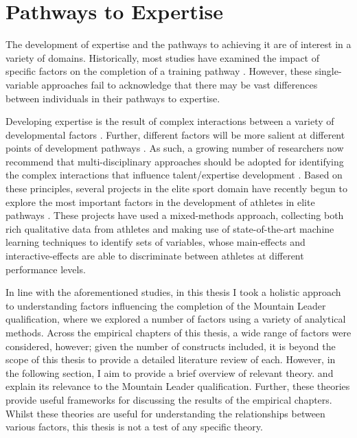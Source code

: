 \documentclass[
  12pt,
  a4paper,
]{book}
\begin{document}
\hypertarget{pathways-to-expertise}{%
\section{Pathways to Expertise}\label{pathways-to-expertise}}

The development of expertise and the pathways to achieving it are of interest in a variety of domains. Historically, most studies have examined the impact of specific factors on the completion of a training pathway \citep[e.g., delays in completing PhDs;][]{VandeSchoot2013a}. However, these single-variable approaches fail to acknowledge that there may be vast differences between individuals in their pathways to expertise.

Developing expertise is the result of complex interactions between a variety of developmental factors \citep[e.g., practice and training, personality traits, motivation, social support to name but a few;][]{Baker2013, Gagne2004, Johnston2018}. Further, different factors will be more salient at different points of development pathways \citep{Rees2016}. As such, a growing number of researchers now recommend that multi-disciplinary approaches should be adopted for identifying the complex interactions that influence talent/expertise development \citep[e.g.,][]{Abernethy2013, Gullich2019, Johnston2018, Pearson2006, Rees2016, Schorer2013}. Based on these principles, several projects in the elite sport domain have recently begun to explore the most important factors in the development of athletes in elite pathways \citep[e.g.,][]{Gullich2019, Hardy2017, Jones2019a, Jones2019b, Jones2020, Rees2016}. These projects have used a mixed-methods approach, collecting both rich qualitative data from athletes and making use of state-of-the-art machine learning techniques to identify sets of variables, whose main-effects and interactive-effects are able to discriminate between athletes at different performance levels.

In line with the aforementioned studies, in this thesis I took a holistic approach to understanding factors influencing the completion of the Mountain Leader qualification, where we explored a number of factors using a variety of analytical methods. Across the empirical chapters of this thesis, a wide range of factors were considered, however; given the number of constructs included, it is beyond the scope of this thesis to provide a detailed literature review of each. However, in the following section, I aim to provide a brief overview of relevant theory. and explain its relevance to the Mountain Leader qualification. Further, these theories provide useful frameworks for discussing the results of the empirical chapters. Whilst these theories are useful for understanding the relationships between various factors, this thesis is not a test of any specific theory.
\end{document}
